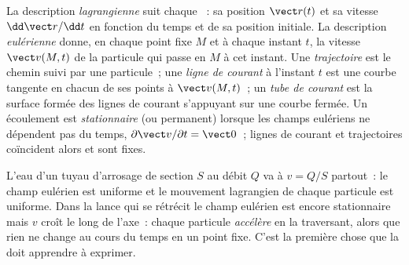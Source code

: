 \begin{definition}\label{def:b2:fluid-kinematics:euler}
La description \emph{lagrangienne} suit chaque ~: sa
position $\vect r(t)$ et sa vitesse $\dd\vect r/\dd t$ en fonction du temps
et de sa position initiale. La description \emph{eulérienne} donne, en
chaque point fixe $M$ et à chaque instant $t$, la vitesse $\vect v(M, t)$ de la
particule qui passe en $M$ à cet instant. Une \emph{trajectoire}
est le chemin suivi par une particule~; une \emph{ligne de courant} à l'instant $t$ est une
courbe tangente en chacun de ses points à $\vect v(M, t)$~; un \emph{tube de courant} est
la surface formée des lignes de courant s'appuyant sur une courbe fermée. Un écoulement est
\emph{stationnaire} (ou permanent) lorsque les champs eulériens ne dépendent pas du
temps, $\partial\vect v/\partial t = \vect 0$~; lignes de courant et trajectoires
coïncident alors et sont fixes.
\end{definition}

\begin{example}\label{ex:b2:fluid-kinematics:hose}
L'eau d'un tuyau d'arrosage de section $S$ au débit $Q$ va à $v = Q/S$
partout~: le champ eulérien est uniforme et le mouvement lagrangien de
chaque particule est uniforme. Dans la lance qui se rétrécit le champ eulérien est
encore stationnaire mais $v$ croît le long de l'axe~: chaque particule
\emph{accélère} en la traversant, alors que rien ne change au cours du temps en un
point fixe. C'est la première chose que la  doit apprendre à exprimer.
\end{example}

